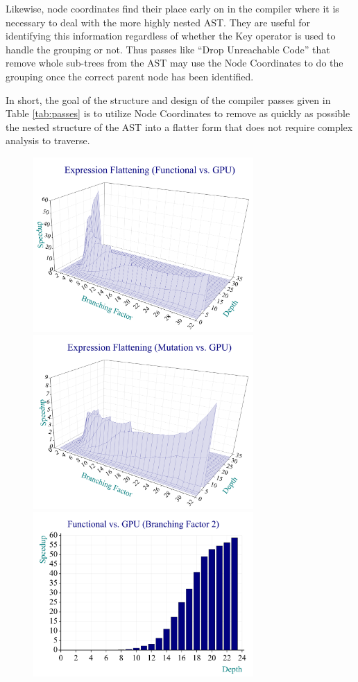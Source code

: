 ﻿\documentclass[numbers,10pt,preprint]{sigplanconf}
\begin{document}
Likewise, node coordinates find their place early on in the compiler where it is necessary to deal with the more highly nested AST. They are useful for identifying this information regardless of whether the Key operator is used to handle the grouping or not. Thus passes like ``Drop Unreachable Code'' that remove whole sub-trees from the AST may use the Node Coordinates to do the grouping once the correct parent node has been identified.

In short, the goal of the structure and design of the compiler passes given in Table \ref{tab:passes} is to utilize Node Coordinates to remove as quickly as possible the nested structure of the AST into a flatter form that does not require complex analysis to traverse.

\begin{figure}
\begin{center}
\includegraphics[width=3.3in]{fnc_gpu_3d}
\includegraphics[width=3.3in]{mut_gpu_3d}
\includegraphics[width=3.3in]{fnc_gpu_2d}

\end{center}
\end{figure}
\end{document}
